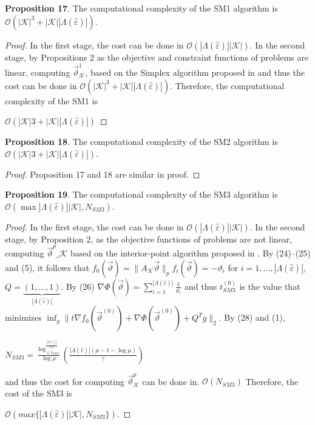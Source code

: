 \documentclass[]{iosart2c}
\begin{document}
  \textbf{Proposition 17}. The computational complexity of the
  SM1 algorithm is $\mathcal{O}(|\mathcal{K}|^3 + |\mathcal{K}| |\Lambda(\hat{\varepsilon} )|)$.

  \begin{proof}
    In the first stage, the cost can be done in
    $\mathcal{O}(|\Lambda(\hat{\varepsilon})| |\mathcal{K}|)$. In the second stage, by Propositions
    2 as the objective and constraint functions of problems
    are linear, computing $\vec{\vartheta}^1_\mathcal{K}$, based on the Simplex
    algorithm proposed in \cite{25} \cite{28} and thus the cost can
    be done in $\mathcal{O}(|\mathcal{K}|^3 + |\mathcal{K}| |\Lambda(\hat{\varepsilon})|)$. Therefore, the computational
    complexity of the SM1 is

    $\mathcal{O}(|\mathcal{K}|3 + |\mathcal{K}| |\Lambda(\hat{\varepsilon})|)$
  \end{proof}

  \textbf{Proposition 18}. The computational complexity of the
  SM2 algorithm is $\mathcal{O}(|\mathcal{K}|3 + |\mathcal{K}| |\Lambda(\hat{\varepsilon})|)$.

  \begin{proof}
    Proposition 17 and 18 are similar in proof.
  \end{proof}

  \textbf{Proposition 19}. The computational complexity of the
  SM3 algorithm is $\mathcal{O}(\max{|\Lambda(\hat{\varepsilon} )| |\mathcal{K}|,N_{SM3}})$.
  \begin{proof}
    In the first stage, the cost can be done in
    $\mathcal{O}(|\Lambda(\hat{\varepsilon})| |\mathcal{K}|)$. In the second stage, by Proposition
    2, as the objective functions of problems are not
    linear, computing $\vec{\vartheta}^p\_\mathcal{K}$
    based on the interior-point algorithm
    proposed in \cite{29}. By (24)–(25) and (5), it
    follows that $f_0(\vec{\vartheta}) = \parallel A_\mathcal{K}\vec{\vartheta}\parallel_p f_i(\vec{\vartheta}) = -\vartheta_i$ for $i =
    1, ... , |\Lambda(\hat{\varepsilon})|$, $Q = \underbrace{(1, ... , 1)}_{|\Lambda(\hat{\varepsilon})|}$. By (26) $\nabla \Phi \left( \vec{\vartheta} \right) = \sum^{|\Lambda(\hat{\varepsilon})|}_{i=1} \frac{1}{\vartheta_i}$
    and thus $t^{(0)}_{SM3}$ is the value that minimizes
    $\inf_g \parallel t \nabla f_0 \left( \vec{\vartheta}^{(0)} \right) +\nabla \Phi \left( \vec{\vartheta}^{(0)} \right)+ Q^T g \parallel _2$. By (28)
    and (1),

    $N_{SM3} = \frac{ \log^{\frac{|\Lambda(\hat{\varepsilon})|}{(0)}}_{\in t_{SM3}}}{\log\mu} \left( \frac{ |\Lambda(\hat{\varepsilon})| (\mu - 1 - \log\mu)}{\gamma} \right)$

    and thus the cost for computing $\vec{\vartheta}^p_\mathcal{K}$ can be done
    in. $\mathcal{O}(N_{SM3})$ Therefore, the cost of the SM3 is

    $\mathcal{O}(max\{|\Lambda(\hat{\varepsilon})| |\mathcal{K}|,N_{SM3}\})$.
  \end{proof}
\end{document}
